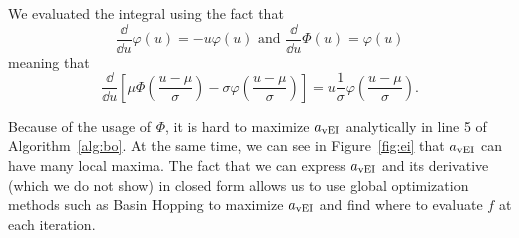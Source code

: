 We evaluated the integral using the fact that
\begin{equation*}
    \frac{ \dd }{ \dd u } \varphi(u) = - u\varphi(u)
    \text{   and   }
    \frac{ \dd }{ \dd u } \Phi(u) = \varphi(u)
\end{equation*}
meaning that
\begin{equation*}
    \frac{ \dd }{ \dd u }
    \left[
        \mu \Phi\left(\frac{ u - \mu }{ \sigma }\right) - \sigma \varphi\left(\frac{ u - \mu }{ \sigma }\right)
        \right]
    = u \frac{ 1 }{ \sigma } \varphi\left( \frac{ u - \mu }{\sigma}\right).
\end{equation*}

Because of the usage of $\Phi$, it is hard to maximize $a_{\mathrm{vEI}}$ analytically in line 5 of Algorithm~\ref{alg:bo}.
At the same time, we can see in Figure~\ref{fig:ei} that $a_{\mathrm{vEI}}$ can have many local maxima.
The fact that we can express $a_{\mathrm{vEI}}$ and its derivative (which we do not show) in closed form
allows us to use global optimization methods such as Basin Hopping \cite{wales1997}
to maximize $a_{\mathrm{vEI}}$ and find where to evaluate $f$ at each iteration.
